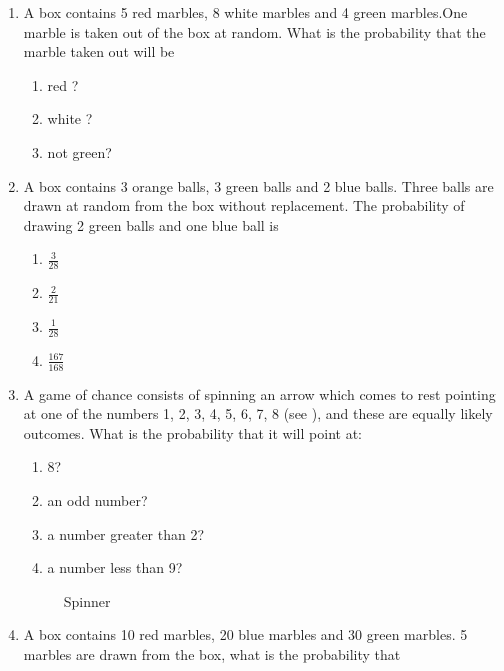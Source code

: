\begin{enumerate}[label=\thesection.\arabic*,ref=\thesection.\theenumi]
\item A box contains 5 red marbles, 8 white marbles and 4 green marbles.One marble is taken
out of the box at random. What is the probability that the marble taken out will be 
\\
\solution
\begin{enumerate}
    \item red ? 
    \item white ? 
    \item  not green?
\end{enumerate}
\solution

\item A box contains 3 orange balls, 3 green balls and 2 blue balls. Three balls are drawn at random from the box without replacement. The probability of drawing 2 green balls and one blue ball is
\begin{enumerate}
\item $\frac{3}{28}$\\
\item $\frac{2}{21}$\\
\item $\frac{1}{28}$\\
\item $\frac{167}{168}$
\end{enumerate}

\item A game of chance consists of spinning an arrow
which comes to rest pointing at one of the numbers
1, 2, 3, 4, 5, 6, 7, 8 (see ), and these are equally
likely outcomes. What is the probability that it will
point at:
\begin{enumerate}
\item 
8?
\item 
an odd number?
\item 
a number greater than 2?
\item 
a number less than 9?
\end{enumerate}
\begin{figure} [p h]
	\centering
	\resizebox{\columnwidth}{!}{}
    \caption{Spinner}
    \label{fig:ncert/10/15/1/12/my_label}
\end{figure}
\solution

\item A box contains 10 red marbles, 20 blue marbles and 30 green marbles. 5 marbles
are drawn from the box, what is the probability that

\end{enumerate}
